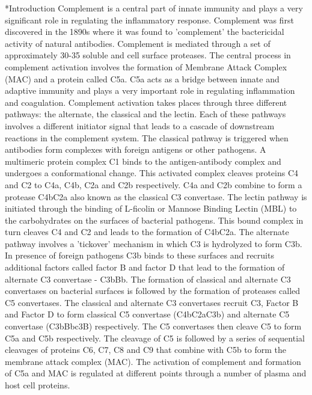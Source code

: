 \documentclass[12pt]{article}
\makeatletter
\renewcommand\section{\@startsection
	{subsection}{2}{0mm}
	{-0.2in}
	{0.05\baselineskip}
	{\normalfont\large\bfseries}}
\makeatother
\begin{document}
\section*{Introduction}
Complement is a central part of innate immunity and plays a very significant role in regulating the inflammatory response. Complement was first discovered in the 1890s where it was found to 'complement' the bactericidal activity of natural antibodies. Complement is mediated through a set of approximately 30-35 soluble and cell surface proteases. The central process in complement activation involves the formation of Membrane Attack Complex (MAC) and a protein called C5a. C5a acts as a bridge between innate and adaptive immunity and plays a very important role in regulating inflammation and coagulation.  Complement activation takes places through three different pathways: the alternate, the classical and the lectin. Each of these pathways involves a different initiator signal that leads to a cascade of downstream reactions in the complement system. The classical pathway is triggered when antibodies form complexes with foreign antigens or other pathogens. A multimeric protein complex C1 binds to the antigen-antibody complex and undergoes a conformational change. This activated complex cleaves proteins C4 and C2 to C4a, C4b, C2a and C2b respectively. C4a and C2b combine to form a protease C4bC2a also known as the classical C3 convertase. The lectin pathway is initiated through the binding of L-ficolin or Mannose Binding Lectin (MBL) to the carbohydrates on the surfaces of bacterial pathogens. This bound complex in turn cleaves C4 and C2 and leads to the formation of C4bC2a. The alternate pathway involves a 'tickover' mechanism in which  C3 is hydrolyzed to form C3b. In presence of foreign pathogens C3b binds to these surfaces and recruits  additional factors called factor B and factor D that lead to the formation of alternate C3 convertase - C3bBb. The formation of classical and alternate C3 convertases on bacterial surfaces is followed by the formation of proteases called C5 convertases. The classical and alternate C3 convertases recruit C3, Factor B and Factor D to form classical C5 convertase (C4bC2aC3b) and alternate C5 convertase (C3bBbc3B) respectively. The C5 convertases then cleave C5 to form C5a and C5b respectively. The cleavage of C5 is followed by a series of sequential cleavages of proteins C6, C7, C8 and C9 that combine with C5b to form the membrane attack complex (MAC).
The activation of complement and formation of C5a and MAC  is regulated at different points through a number of plasma and host cell proteins.
\end{document}
